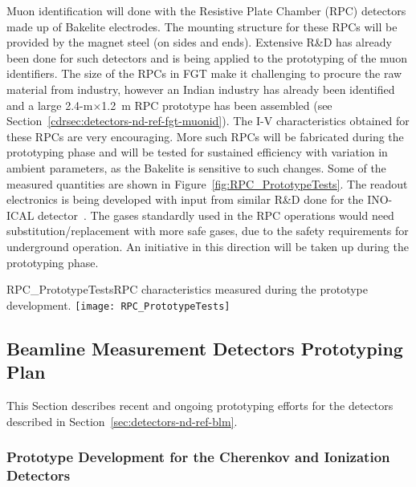 Muon identification will done with the Resistive Plate Chamber (RPC)
detectors made up of Bakelite electrodes.  The mounting structure for these
RPCs will be provided by the magnet steel (on sides and ends). %
Extensive R\&D has already been done for such detectors and 
is being applied 
to the prototyping of the
muon identifiers. The size of the RPCs in FGT make it 
challenging to procure the raw material from industry, however an Indian 
industry has already been identified and a large 2.4-m$\times$1.2~m
RPC prototype has been assembled (see
Section~\ref{cdrsec:detectors-nd-ref-fgt-muonid}). The I-V
characteristics obtained for these RPCs are very encouraging. More such
RPCs will be fabricated during the prototyping phase and will be  
tested for sustained efficiency %
with variation
in ambient parameters, as the Bakelite is sensitive to such
changes. Some of the measured quantities are shown in
Figure~\ref{fig:RPC_PrototypeTests}.  The readout electronics is being
developed with input from similar R\&D done for the INO-ICAL
detector~\cite{1748-0221-7-10-P10003}. The gases standardly used in the RPC operations would need
substitution/replacement with more safe gases, due to the safety requirements for underground operation. 
An initiative in
this direction will be taken up during the prototyping phase.
\begin{cdrfigure}
{RPC_PrototypeTests}{RPC characteristics measured during the prototype development.}
\texttt{[image: RPC\_PrototypeTests]}
\end{cdrfigure}



\subsection{Beamline Measurement Detectors Prototyping Plan}
\label{sec:proto-nd-blm}
This Section describes recent and ongoing prototyping efforts for the detectors described in Section~\ref{sec:detectors-nd-ref-blm}.


\subsubsection{Prototype Development for the Cherenkov and Ionization Detectors}
\label{subsec:proto-blm-muon-cherenkov-proto}

